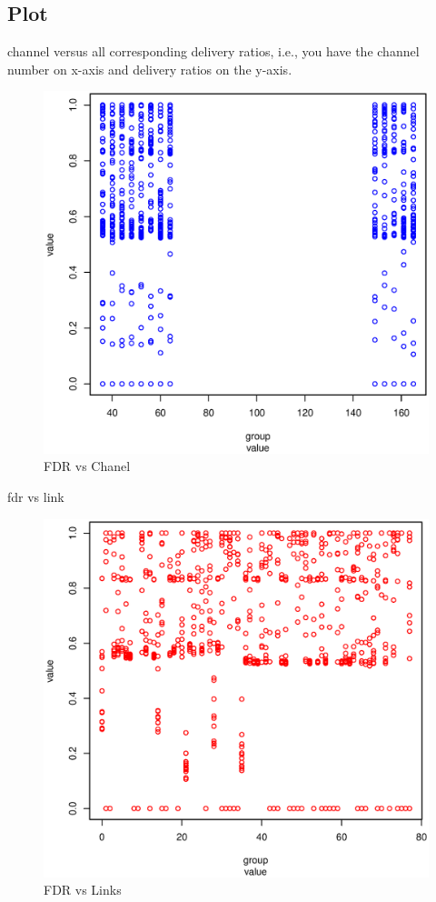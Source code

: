 \documentclass [12 pt , a4paper ] {article}
\begin{document}
\subsection{Plot}
\par channel versus all corresponding delivery ratios, i.e., you have the channel number on
x-axis and delivery ratios on the y-axis.
\begin{figure}[!ht]
  \centering
  \includegraphics[scale=0.8]{fdrvsch.eps}
  \caption{FDR vs Chanel}
  \label{fig:fdrvsch}
\end{figure}
\par fdr vs link
\begin{figure}[!ht]
  \centering
  \includegraphics[scale=0.8]{fdrvslink.eps}
  \caption{FDR vs Links}
  \label{fig:fdrvslink}
\end{figure}
\end{document}
